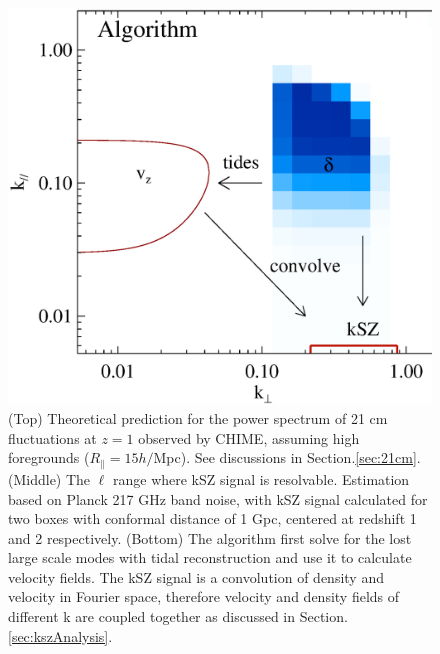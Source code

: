 \begin{figure}[tbp]
\begin{minipage}[t]{\linewidth}
\includegraphics[width=\textwidth]{figure/demo_convolution.eps}
\vspace{-0.6cm}
\end{minipage}
\caption{
(Top) Theoretical prediction for the power spectrum of 21 cm fluctuations at $z=1$ observed by CHIME, assuming high foregrounds ($R_\parallel=15 h/$Mpc). See discussions in Section.\ref{sec:21cm}. (Middle) 
The $\ell$ range where kSZ signal is resolvable. 
Estimation based on Planck 217 GHz band noise, with 
kSZ signal calculated for two boxes with conformal distance of 1 Gpc, centered at redshift 1 and 2 respectively.
(Bottom) The algorithm first solve for the lost large scale modes 
with tidal reconstruction 
and use it to calculate velocity fields.   
The kSZ signal is a convolution of density and velocity in Fourier space, 
therefore velocity and density fields of different k are coupled together 
as discussed in Section.\ref{sec:kszAnalysis}. 
}
\end{figure}
